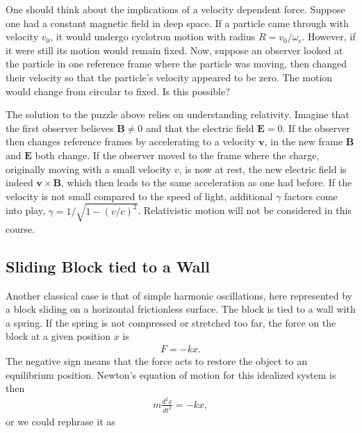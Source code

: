\documentclass[letterpaper,10pt,english]{sphinxmanual}
\begin{document}
One should think about the implications of a velocity dependent
force. Suppose one had a constant magnetic field in deep space. If a
particle came through with velocity \(v_0\), it would undergo cyclotron
motion with radius \(R=v_0/\omega_c\). However, if it were still its
motion would remain fixed. Now, suppose an observer looked at the
particle in one reference frame where the particle was moving, then
changed their velocity so that the particle’s velocity appeared to be
zero. The motion would change from circular to fixed. Is this
possible?

The solution to the puzzle above relies on understanding
relativity. Imagine that the first observer believes \(\boldsymbol{B}\ne 0\) and
that the electric field \(\boldsymbol{E}=0\). If the observer then changes
reference frames by accelerating to a velocity \(\boldsymbol{v}\), in the new
frame \(\boldsymbol{B}\) and \(\boldsymbol{E}\) both change. If the observer moved to the
frame where the charge, originally moving with a small velocity \(v\),
is now at rest, the new electric field is indeed \(\boldsymbol{v}\times\boldsymbol{B}\),
which then leads to the same acceleration as one had before. If the
velocity is not small compared to the speed of light, additional
\(\gamma\) factors come into play,
\(\gamma=1/\sqrt{1-(v/c)^2}\). Relativistic motion will not be
considered in this course.


\subsection{Sliding Block tied to a Wall}
\label{\detokenize{chapter3:sliding-block-tied-to-a-wall}}
Another classical case is that of simple harmonic oscillations, here represented by a block sliding on a horizontal frictionless surface. The block is tied to a wall with a spring. If the spring is not compressed or stretched too far, the force on the block at a given position \(x\) is
\begin{equation*}
\begin{split}
F=-kx.
\end{split}
\end{equation*}
The negative sign means that the force acts to restore the object to an equilibrium position. Newton’s equation of motion for this idealized system is then
\begin{equation*}
\begin{split}
m\frac{d^2x}{dt^2}=-kx,
\end{split}
\end{equation*}
or we could rephrase it as
\end{document}
